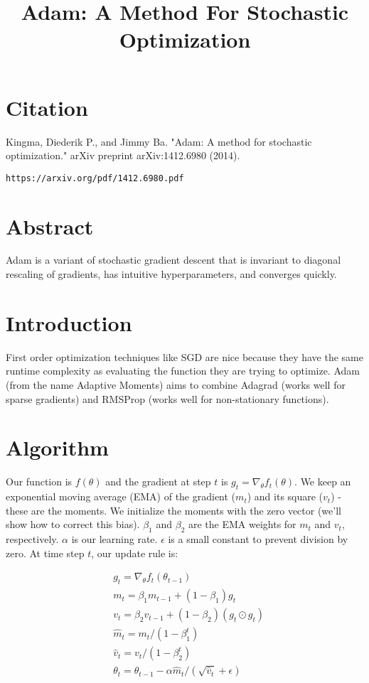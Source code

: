 \documentclass[a4paper]{article}
\title{Adam: A Method For Stochastic Optimization}
\date{}
\begin{document}
\maketitle

\section{Citation}
Kingma, Diederik P., and Jimmy Ba. "Adam: A method for stochastic optimization." arXiv preprint arXiv:1412.6980 (2014).

\begin{verbatim}
https://arxiv.org/pdf/1412.6980.pdf
\end{verbatim}

\section{Abstract}
Adam is a variant of stochastic gradient descent that is invariant to diagonal
rescaling of gradients, has intuitive hyperparameters, and converges quickly.

\section{Introduction}
First order optimization techniques like SGD are nice because they have the
same runtime complexity as evaluating the function they are trying to
optimize. Adam (from the name Adaptive Moments) aims to combine Adagrad (works
well for sparse gradients) and RMSProp (works well for non-stationary
functions).

\section{Algorithm}
Our function is $f(\theta)$ and the gradient at step $t$ is
$g_t = \nabla_{\theta} f_t(\theta)$. We keep an exponential moving average (EMA)
of the gradient ($m_t$) and its
square ($v_t$) - these are the moments. We initialize the moments with the zero
vector (we'll show how to correct this bias). $\beta_1$ and $\beta_2$ are the
EMA weights for $m_t$ and $v_t$, respectively. $\alpha$ is our learning rate.
$\epsilon$ is a small constant to prevent division by zero. At time step $t$,
our update rule is:

\begin{align}
  & g_t = \nabla_{\theta} f_t(\theta_{t-1}) \\
  & m_t = \beta_1 m_{t-1} + (1 - \beta_1)  g_t \\
  & v_t = \beta_2 v_{t-1} + (1 - \beta_2) (g_t \odot g_t) \\
  & \hat{m}_t = m_t / (1 - \beta_1^t) \\
  & \hat{v}_t = v_t / (1 - \beta_2^t) \\
  & \theta_t = \theta_{t-1} - \alpha \hat{m}_t / (\sqrt{\hat{v}_t} + \epsilon)
\end{align}
\end{document}
